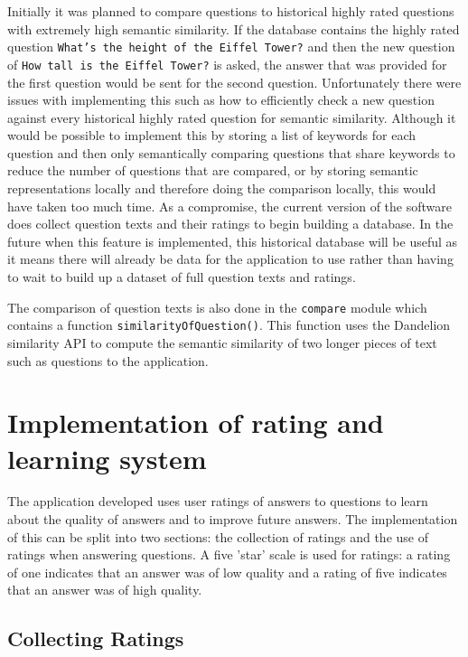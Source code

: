 \documentclass[authoryearcitations]{UoYCSproject}
\begin{document}
Initially it was planned to compare questions to historical highly rated questions with extremely high semantic similarity. If the database contains the highly rated question \texttt{What's the height of the Eiffel Tower?} and then the new question of \texttt{How tall is the Eiffel Tower?} is asked, the answer that was provided for the first question would be sent for the second question. Unfortunately there were issues with implementing this such as how to efficiently check a new question against every historical highly rated question for semantic similarity. Although it would be possible to implement this by storing a list of keywords for each question and then only semantically comparing questions that share keywords to reduce the number of questions that are compared, or by storing semantic representations locally and therefore doing the comparison locally, this would have taken too much time. As a compromise, the current version of the software does collect question texts and their ratings to begin building a database. In the future when this feature is implemented, this historical database will be useful as it means there will already be data for the application to use rather than having to wait to build up a dataset of full question texts and ratings.

The comparison of question texts is also done in the \texttt{compare} module which contains a function \texttt{similarityOfQuestion()}. This function uses the Dandelion~\cite{serviceDandelionSim} similarity API to compute the semantic similarity of two longer pieces of text such as questions to the application.

\section{Implementation of rating and learning system}
\label{sec:implementationRatingLearningSys}

The application developed uses user ratings of answers to questions to learn about the quality of answers and to improve future answers. The implementation of this can be split into two sections: the collection of ratings and the use of ratings when answering questions. A five 'star' scale is used for ratings: a rating of one indicates that an answer was of low quality and a rating of five indicates that an answer was of high quality.

\sloppy
\subsection{Collecting Ratings}
\label{subsec:collectingRatings}
\end{document}
